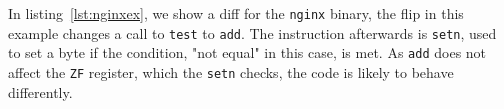 In listing~\ref{lst:nginxex}, we show a diff for the \texttt{nginx} binary, the
flip in this example changes a call to \texttt{test} to \texttt{add}. The
instruction afterwards is \texttt{setn}, used to set a byte if the condition,
"not equal" in this case, is met. As \texttt{add} does not affect the
\texttt{ZF} register, which the \texttt{setn} checks, the code is likely to
behave differently.

